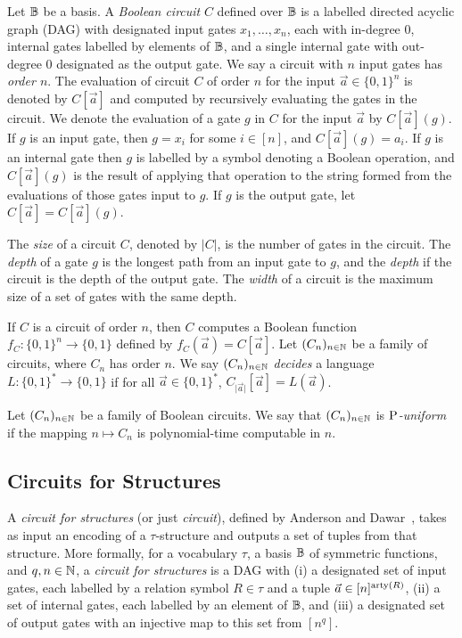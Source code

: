 \documentclass[../paper.tex]{subfiles}
\begin{document}
Let $\mathbb{B}$ be a basis. A \emph{Boolean circuit} $C$ defined over $\mathbb{B}$ is a
labelled directed acyclic graph (DAG) with designated input gates $x_1, \ldots,
x_n$, each with in-degree $0$, internal gates labelled by elements of $\mathbb{B}$, and
a single internal gate with out-degree $0$ designated as the output gate. We say
a circuit with $n$ input gates has \emph{order $n$}. The evaluation of circuit
$C$ of order $n$ for the input $\vec{a} \in \{0,1\}^n$ is denoted by
$C[\vec{a}]$ and computed by recursively evaluating the gates in the circuit. We
denote the evaluation of a gate $g$ in $C$ for the input $\vec{a}$ by
$C[\vec{a}](g)$. If $g$ is an input gate, then $g = x_i$ for some $i \in [n]$,
and $C[\vec{a}](g) = a_i$. If $g$ is an internal gate then $g$ is labelled by a
symbol denoting a Boolean operation, and $C[\vec{a}](g)$ is the result of
applying that operation to the string formed from the evaluations of those gates
input to $g$. If $g$ is the output gate, let $C[\vec{a}] = C[\vec{a}](g)$.

The \emph{size} of a circuit $C$, denoted by $\vert C \vert$, is the number of
gates in the circuit. The \emph{depth} of a gate $g$ is the longest path from an
input gate to $g$, and the \emph{depth} if the circuit is the depth of the
output gate. The \emph{width} of a circuit is the maximum size of a set of gates
with the same depth.

If $C$ is a circuit of order $n$, then $C$ computes a Boolean function $f_C :
\{0,1\}^n \rightarrow \{0,1\}$ defined by $f_C(\vec{a}) = C[\vec{a}]$. Let
$(C_n)_{n \in \mathbb{N}}$ be a family of circuits, where $C_n$ has order $n$. We say
$(C_n)_{n \in \mathbb{N}}$ \emph{decides} a language $L : \{0,1\}^{*} \rightarrow
\{0,1\}$ if for all $\vec{a} \in \{0,1\}^{*}$, $C_{\vert \vec{a} \vert}
[\vec{a}] = L(\vec{a})$.

\begin{definition}
  Let $(C_n)_{n \in \mathbb{N}}$ be a family of Boolean circuits. We say that
  $(C_n)_{n \in \mathbb{N}}$ is \emph{$\mathrm{P}$-uniform} if the mapping $n \mapsto C_n$
  is polynomial-time computable in $n$.
\end{definition}

\subsection{Circuits for Structures}
A \emph{circuit for structures} (or just \emph{circuit}), defined by Anderson
and Dawar~\cite{AndersonD17}, takes as input an encoding of a $\tau$-structure
and outputs a set of tuples from that structure. More formally, for a vocabulary
$\tau$, a basis $\mathbb{B}$ of symmetric functions, and $q, n \in \mathbb{N}$, a
\emph{circuit for structures} is a DAG with (i) a designated set of input gates,
each labelled by a relation symbol $R \in \tau$ and a tuple $\vec{a} \in
[n]^{\mathrm{arty}(R)}$, (ii) a set of internal gates, each labelled by an element of
$\mathbb{B}$, and (iii) a designated set of output gates with an injective
map to this set from $[n^q]$.
\end{document}
